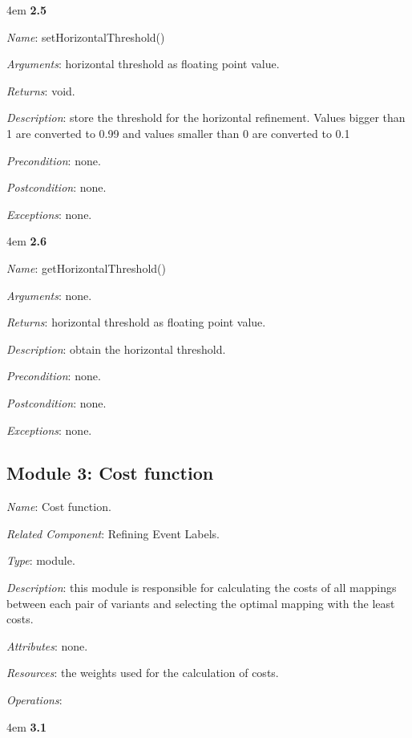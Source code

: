 \documentclass[notitlepage]{article}
\begin{document}
\begin{flushleft}
\par
\begingroup
\leftskip4em
\textbf{2.5} 

\textit{Name}: setHorizontalThreshold()

\textit{Arguments}: horizontal threshold as floating point value.

\textit{Returns}: void.

\textit{Description}: store the threshold for the horizontal refinement. Values bigger than 1 are converted to 0.99 and values smaller than 0 are converted to 0.1

\textit{Precondition}: none.

\textit{Postcondition}: none.

\textit{Exceptions}: none.
\par
\endgroup


\par
\begingroup
\leftskip4em
\textbf{2.6} 

\textit{Name}: getHorizontalThreshold()

\textit{Arguments}: none.

\textit{Returns}: horizontal threshold as floating point value.

\textit{Description}: obtain the horizontal threshold.

\textit{Precondition}: none.

\textit{Postcondition}: none.

\textit{Exceptions}: none.
\par
\endgroup


\subsection{Module 3: Cost function}
\textit{Name}: Cost function.

\textit{Related Component}: Refining Event Labels.

\textit{Type}: module.

\textit{Description}: this module is responsible for calculating the costs of all mappings between each pair of variants and selecting the optimal mapping with the least costs. 

\textit{Attributes}: none.

\textit{Resources}: the weights used for the calculation of costs.

\textit{Operations}: 
\medskip

\par
\begingroup
\leftskip4em
\textbf{3.1} 


\end{flushleft}
\end{document}
